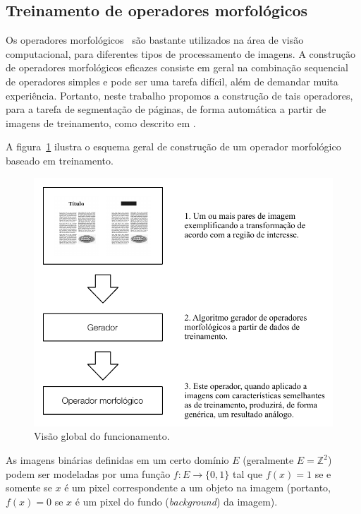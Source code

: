 \documentclass[times, 10pt,twocolumn]{article}
\begin{document}
\subsection{Treinamento de operadores morfológicos}

Os operadores morfológicos~\cite{Serra:1983:IAM:1098652} são bastante
utilizados na área de visão computacional, para diferentes tipos de
processamento de imagens. A construção de operadores morfológicos
eficazes consiste em geral na combinação sequencial de operadores
simples e pode ser uma tarefa difícil, além de demandar muita
experiência. Portanto, neste trabalho propomos a construção de tais
operadores, para a tarefa de segmentação de páginas, de forma
automática a partir de imagens de treinamento, como descrito em
\cite{Tomita:1996:PrAuMa}.

A figura~\ref{fig:schema_overview} ilustra o esquema geral de
construção de um operador morfológico baseado em treinamento.
\begin{figure}[htb!]
\begin{center}
\includegraphics{assets/methodology.pdf}
\end{center}
\caption{Visão global do funcionamento.}
\label{fig:schema_overview}
\end{figure}

As imagens binárias definidas em um certo domínio $E$ (geralmente
$E=\mathbb{Z}^2$) podem ser modeladas por uma função $f: E \to
\{0,1\}$ tal que $f(x)=1$ se e somente se $x$ é um pixel
correspondente a um objeto na imagem (portanto, $f(x)=0$ se $x$
é um pixel do fundo (\emph{background}) da imagem).
\end{document}
